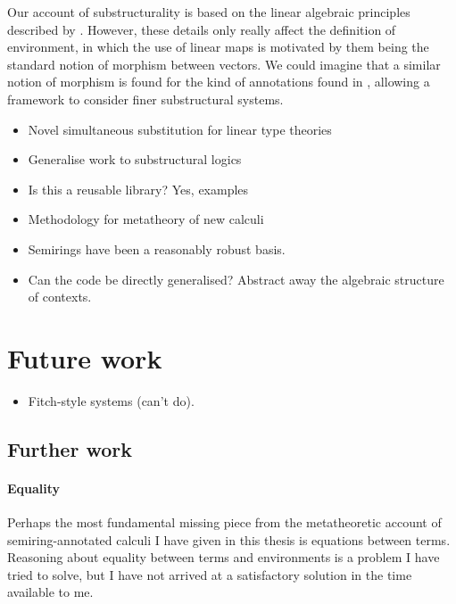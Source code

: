 Our account of substructurality is based on the linear algebraic
principles described by \citet{WA21}.
However, these details only really affect the definition of environment,
in which the use of linear maps is motivated by them being the standard notion
of morphism between vectors.
We could imagine that a similar notion of morphism is found for the kind of
annotations found in \citet{LicataSR17}, allowing a framework to consider
finer substructural systems.

\begin{itemize}
  \item Novel simultaneous substitution for linear type theories
  \item Generalise \citet{AACMM21} work to substructural logics
  \item Is this a reusable library? Yes, examples
  \item Methodology for metatheory of new calculi
  \item Semirings have been a reasonably robust basis.
  \item Can the code be directly generalised?
    Abstract away the algebraic structure of contexts.
\end{itemize}

\section{Future work}

\begin{itemize}
  \item Fitch-style systems (can't do).
\end{itemize}

\subsection{Further work}

\paragraph{Equality}
Perhaps the most fundamental missing piece from the metatheoretic account of
semiring-annotated calculi I have given in this thesis is equations between
terms.
Reasoning about equality between terms and environments is a problem I have
tried to solve, but I have not arrived at a satisfactory solution in the time
available to me.

